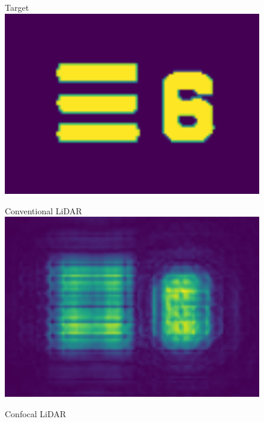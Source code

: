 \documentclass{article}
\begin{document}
\begin{figure}[hbt!]
\centering
\begin{minipage}{.225\linewidth}
\centering
\captionsetup{type=figure}
Target \
\includegraphics[width=\linewidth]{001 Object.png}
\label{subfig:original}
\end{minipage}\hfill
\begin{minipage}{.225\linewidth}
\centering
\captionsetup{type=figure}
Conventional LiDAR \
\includegraphics[width=\linewidth]{002 wide field imaging.png}
\label{subfig:widefield}
\end{minipage}\hfill
\begin{minipage}{.225\linewidth}
\centering
\captionsetup{type=figure}
Confocal LiDAR \

\end{minipage}
\end{figure}
\end{document}
